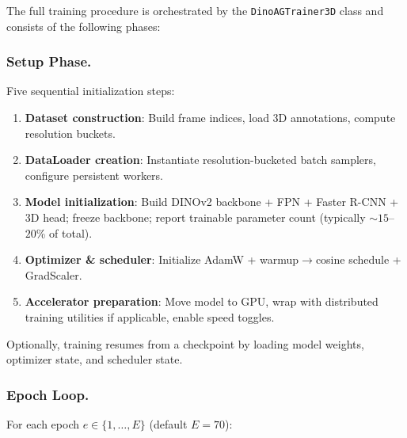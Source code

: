 \documentclass[runningheads]{llncs}
\begin{document}
The full training procedure is orchestrated by the \texttt{DinoAGTrainer3D} class and consists of the following phases:

\subsubsection{Setup Phase.}
Five sequential initialization steps:
\begin{enumerate}
    \item \textbf{Dataset construction}: Build frame indices, load 3D annotations, compute resolution buckets.
    \item \textbf{DataLoader creation}: Instantiate resolution-bucketed batch samplers, configure persistent workers.
    \item \textbf{Model initialization}: Build DINOv2 backbone + FPN + Faster R-CNN + 3D head; freeze backbone; report trainable parameter count (typically ${\sim}15$--$20$\% of total).
    \item \textbf{Optimizer \& scheduler}: Initialize AdamW + warmup$\to$cosine schedule + GradScaler.
    \item \textbf{Accelerator preparation}: Move model to GPU, wrap with distributed training utilities if applicable, enable speed toggles.
\end{enumerate}
Optionally, training resumes from a checkpoint by loading model weights, optimizer state, and scheduler state.

\subsubsection{Epoch Loop.}
For each epoch $e \in \{1, \ldots, E\}$ (default $E = 70$):
\end{document}
